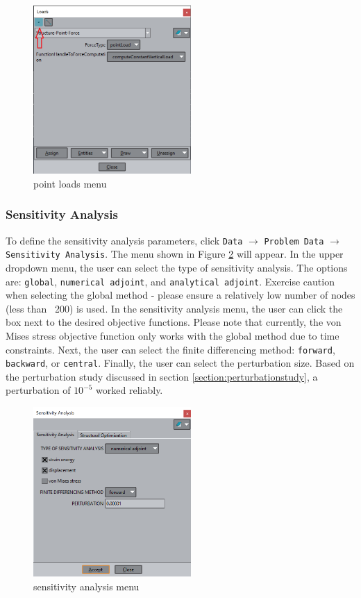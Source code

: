 \begin{figure}[ht]
  \centering
  \includegraphics[width=60mm]{images/GiD_loads_point.png}
  \caption{point loads menu}
  \label{fig:GiDLoadsPoint}
\end{figure}
\subsubsection{Sensitivity Analysis}
To define the sensitivity analysis parameters, click \texttt{Data} $\rightarrow$ \texttt{Problem Data} $\rightarrow$ \texttt{Sensitivity Analysis}. The menu shown in Figure \ref{fig:GiDSensAnalMenu} will appear. In the upper dropdown menu, the user can select the type of sensitivity analysis. The options are: \texttt{global}, \texttt{numerical adjoint}, and \texttt{analytical adjoint}. Exercise caution when selecting the global method - please ensure a relatively low number of nodes (less than ~200) is used. In the sensitivity analysis menu, the user can click the box next to the desired objective functions. Please note that currently, the von Mises stress objective function only works with the global method due to time constraints. Next, the user can select the finite differencing method: \texttt{forward}, \texttt{backward}, or \texttt{central}. Finally, the user can select the perturbation size. Based on the perturbation study discussed in section \ref{section:perturbationstudy}, a perturbation of $10^{-5}$ worked reliably.
\begin{figure}[ht]
  \centering
  \includegraphics[width=60mm]{images/GiD_sens_analysis.png}
  \caption{sensitivity analysis menu}
  \label{fig:GiDSensAnalMenu}
\end{figure}

